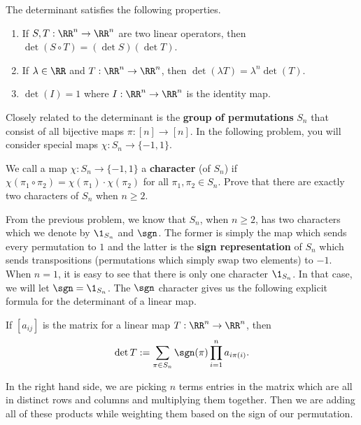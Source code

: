 \documentclass[11pt]{article}
\begin{document}
\begin{prop}
    The determinant satisfies the following properties.   
\begin{enumerate}[label = (\roman*)]
    \item If $S, T : \RR^n \to \RR^n$ are two linear operators, then $\det (S \circ T) = (\det S) (\det T)$. 
    \item If $\lambda \in \RR$ and $T : \RR^n \to \RR^n$, then $\det (\lambda T) = \lambda^n \det (T)$. 
    \item $\det (I) = 1$ where $I : \RR^n \to \RR^n$ is the identity map. 
\end{enumerate}
\end{prop}

Closely related to the determinant is the \textbf{group of permutations} $S_n$ that consist of all bijective maps $\pi : [n] \to [n]$. In the following problem, you will consider special maps $\chi : S_n \to \{-1, 1\}$. 

\begin{prob} [30 points]
    We call a map $\chi : S_n \to \{-1, 1\}$ a \textbf{character} (of $S_n$) if $\chi(\pi_1 \circ \pi_2) = \chi(\pi_1) \cdot \chi(\pi_2)$ for all $\pi_1, \pi_2 \in S_n$. Prove that there are exactly two characters of $S_n$ when $n \geq 2$.  
\end{prob}

From the previous problem, we know that $S_n$, when $n \geq 2$, has two characters which we denote by $\1_{S_n}$ and $\sgn$. The former is simply the map which sends every permutation to $1$ and the latter is the \textbf{sign representation} of $S_n$ which sends transpositions (permutations which simply swap two elements) to $-1$. When $n = 1$, it is easy to see that there is only one character $\1_{S_n}$. In that case, we will let $\sgn = \1_{S_n}$. The $\sgn$ character gives us the following explicit formula for the determinant of a linear map. 

\begin{prop}
    If $[a_{ij}]$ is the matrix for a linear map $T : \RR^n \to \RR^n$, then 
    \[
        \det T := \sum_{\pi \in S_n} \sgn(\pi) \prod_{i = 1}^n a_{i \pi(i)}.
    \]
\end{prop}
    
In the right hand side, we are picking $n$ terms entries in the matrix which are all in distinct rows and columns and multiplying them together. Then we are adding all of these products while weighting them based on the sign of our permutation. 
\end{document}

